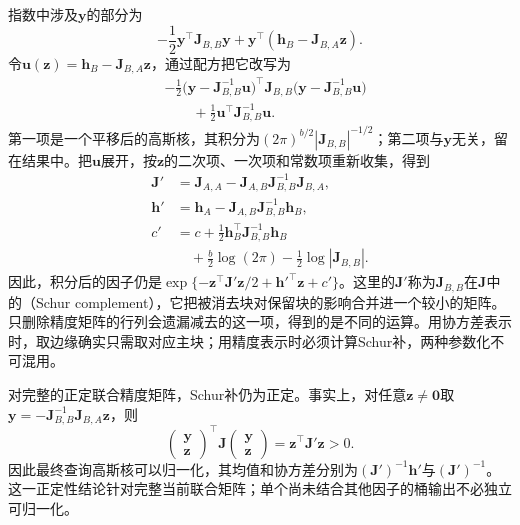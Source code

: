 指数中涉及$\bm{y}$的部分为
\[
  -\frac12\bm{y}^{\top}\bm{J}_{B,B}\bm{y}
  +\bm{y}^{\top}(\bm{h}_B-\bm{J}_{B,A}\bm{z}).
\]
令$\bm{u}(\bm{z})=\bm{h}_B-\bm{J}_{B,A}\bm{z}$，通过配方把它改写为
\begin{equation}
  \begin{aligned}
    &-\frac12
      \bigl(\bm{y}-\bm{J}_{B,B}^{-1}\bm{u}\bigr)^{\top}
      \bm{J}_{B,B}
      \bigl(\bm{y}-\bm{J}_{B,B}^{-1}\bm{u}\bigr)\\
    &\hspace{2em}
      +\frac12\bm{u}^{\top}\bm{J}_{B,B}^{-1}\bm{u}.
  \end{aligned}
  \label{eq:pgm-elimination-complete-square}
\end{equation}
第一项是一个平移后的高斯核，其积分为$(2\pi)^{b/2}|\bm{J}_{B,B}|^{-1/2}$；第二项与$\bm{y}$无关，留在结果中。把$\bm{u}$展开，按$\bm{z}$的二次项、一次项和常数项重新收集，得到
\begin{equation}
  \begin{aligned}
    \bm{J}'&=\bm{J}_{A,A}
      -\bm{J}_{A,B}\bm{J}_{B,B}^{-1}\bm{J}_{B,A},\\
    \bm{h}'&=\bm{h}_A
      -\bm{J}_{A,B}\bm{J}_{B,B}^{-1}\bm{h}_B,\\
    c'&=c+\frac12\bm{h}_B^{\top}\bm{J}_{B,B}^{-1}\bm{h}_B\\
      &\quad+\frac b2\log(2\pi)-\frac12\log|\bm{J}_{B,B}|.
  \end{aligned}
  \label{eq:pgm-elimination-schur}
\end{equation}
因此，积分后的因子仍是$\exp\{-\bm{z}^{\top}\bm{J}'\bm{z}/2+\bm{h}'^{\top}\bm{z}+c'\}$。这里的$\bm{J}'$称为$\bm{J}_{B,B}$在$\bm{J}$中的（Schur complement），它把被消去块对保留块的影响合并进一个较小的矩阵。只删除精度矩阵的行列会遗漏减去的这一项，得到的是不同的运算。用协方差表示时，取边缘确实只需取对应主块；用精度表示时必须计算Schur补，两种参数化不可混用。

对完整的正定联合精度矩阵，Schur补仍为正定。事实上，对任意$\bm{z}\ne\bm{0}$取$\bm{y}=-\bm{J}_{B,B}^{-1}\bm{J}_{B,A}\bm{z}$，则
\[
  \begin{pmatrix}\bm{y}\\\bm{z}\end{pmatrix}^{\top}
  \bm{J}
  \begin{pmatrix}\bm{y}\\\bm{z}\end{pmatrix}
  =\bm{z}^{\top}\bm{J}'\bm{z}>0.
\]
因此最终查询高斯核可以归一化，其均值和协方差分别为$(\bm{J}')^{-1}\bm{h}'$与$(\bm{J}')^{-1}$。这一正定性结论针对完整当前联合矩阵；单个尚未结合其他因子的桶输出不必独立可归一化。

